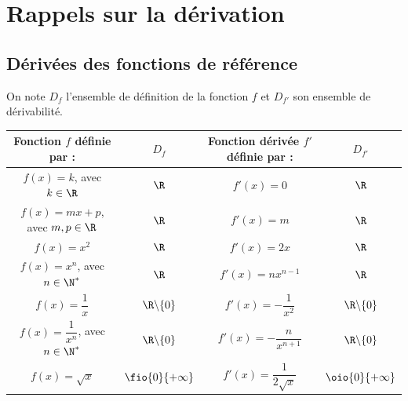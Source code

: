 \documentclass[a4paper,11pt,cours]{nsi} %
\begin{document}
\section{Rappels sur la dérivation}
\subsection*{Dérivées des fonctions de référence}
\begin{propriete}[ ]
	On note $D_f$ l'ensemble de définition de la fonction $f$ et $D_{f'}$ son ensemble de dérivabilité.\\
	
	\renewcommand{\arraystretch}{2}
	\begin{tabular}{|c|c|c|c|}
		\hline
		\textbf{Fonction $f$ définie par :} & $D_f$ & \textbf{Fonction dérivée $f'$ définie par :} & $D_{f'}$\\
		\hline
		
		$f(x)=k$, avec $k\in \R$ & $\R$ & $f'(x)=0$ & $\R$ \\
		\hline
		$f(x)=mx+p$, avec $m,p \in \R$ & $\R$ & $f'(x)=m$ & $\R$ \\
		\hline
		$f(x)=x^2$ & $\R$ & $f'(x)=2x$ & $\R$ \\
		\hline
		$f(x)=x^n$, avec $n\in \N^*$ & $\R$ & $f'(x)=nx^{n-1}$ & $\R$ \\
		\hline
		$f(x)=\dfrac{1}{x}$ & $\R \backslash \{0\}$ & $f'(x)=-\dfrac{1}{x^2}$ & $\R\backslash \{0\}$ \\
		\hline
		$f(x)=\dfrac{1}{x^n}$, avec $n\in \N^* $& $\R \backslash \{0\}$ & $f'(x)=-\dfrac{n}{x^{n+1}}$ & $\R\backslash \{0\}$ \\
		\hline
		$f(x)=\sqrt{x}$ & $\fio{0}{+\infty}$ & $f'(x)=\dfrac{1}{2\sqrt{x}}$ & $\oio{0}{+\infty}$\\
		\hline
	\end{tabular}
\end{propriete}


\newpage
\end{document}
